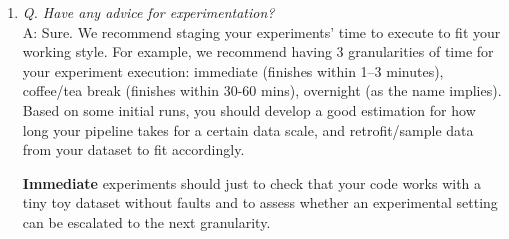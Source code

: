 \documentclass[11pt]{article}
\begin{document}
\begin{enumerate}


    \item {\it Q. Have any advice for experimentation?}\\
    A: Sure. We recommend staging your experiments' time to execute to fit your working style.  For example, we recommend having 3 granularities of time for your experiment execution: immediate (finishes within 1--3 minutes), coffee/tea break (finishes within 30-60 mins), overnight (as the name implies).  Based on some initial runs, you should develop a good estimation for how long your pipeline takes for a certain data scale, and retrofit/sample data from your dataset to fit accordingly.

    {\bf Immediate} experiments should just to check that your code works with a tiny toy dataset without faults and to assess whether an experimental setting can be escalated to the next granularity.  


\end{enumerate}
\end{document}
